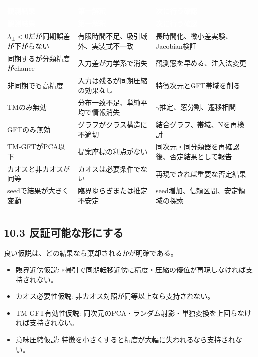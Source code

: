 \documentclass[11pt,a4paper]{ltjsarticle}
\renewcommand{\arraystretch}{1.25}
\begin{document}
\begingroup
\small
\renewcommand{\arraystretch}{1.35}
\begin{longtable}{@{}>{\raggedright\arraybackslash}p{}>{\raggedright\arraybackslash}p{}>{\raggedright\arraybackslash}p{}@{}}
\rowcolor{researchink}
\textcolor{white}{\textbf{観測結果}} & \textcolor{white}{\textbf{第一解釈}} & \textcolor{white}{\textbf{次に行う確認}} \\
\endfirsthead
\rowcolor{researchink}
\textcolor{white}{\textbf{観測結果}} & \textcolor{white}{\textbf{第一解釈}} & \textcolor{white}{\textbf{次に行う確認}} \\
\endhead
\(\lambda_{\perp}<0\)だが同期誤差が下がらない & 有限時間不足、吸引域外、実装式不一致 & 長時間化、微小差実験、Jacobian検証 \\
\addlinespace[2pt]
\rowcolor{researchpale}
同期するが分類精度がchance & 入力差が力学系で消失 & 観測窓を早める、注入法変更 \\
\addlinespace[2pt]
非同期でも高精度 & 入力は残るが同期圧縮の効果なし & 特徴次元とGFT帯域を削る \\
\addlinespace[2pt]
\rowcolor{researchpale}
TMのみ無効 & 分布一致不足、単純平均で情報消失 & \(\gamma\)推定、窓分割、遷移相関 \\
\addlinespace[2pt]
GFTのみ無効 & グラフがクラス構造に不適切 & 結合グラフ、帯域、Nを再検討 \\
\addlinespace[2pt]
\rowcolor{researchpale}
TM-GFTがPCA以下 & 提案座標の利点がない & 同次元・同分類器を再確認後、否定結果として報告 \\
\addlinespace[2pt]
カオスと非カオスが同等 & カオスは必要条件でない & 再現できれば重要な否定結果 \\
\addlinespace[2pt]
\rowcolor{researchpale}
seedで結果が大きく変動 & 臨界ゆらぎまたは推定不安定 & seed増加、信頼区間、安定領域の探索 \\
\addlinespace[2pt]
\end{longtable}
\endgroup

\subsection*{\textcolor{researchblue}{10.3 反証可能な形にする}}

良い仮説は、どの結果なら棄却されるかが明確である。\par

\begin{itemize}

\item 臨界近傍仮説: \(\varepsilon\)掃引で同期転移近傍に精度・圧縮の優位が再現しなければ支持されない。

\item カオス必要性仮説: 非カオス対照が同等以上なら支持されない。

\item TM-GFT有効性仮説: 同次元のPCA・ランダム射影・単独変換を上回らなければ支持されない。

\item 意味圧縮仮説: 特徴を小さくすると精度が大幅に失われるなら支持されない。

\end{itemize}
\end{document}

